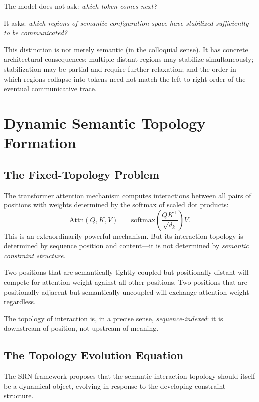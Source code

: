 \documentclass[11pt, a4paper]{article}
\theoremstyle{srn}
\theoremstyle{srnremark}
\begin{document}
The model does not ask: \emph{which token comes next?}

It asks: \emph{which regions of semantic configuration space have
stabilized sufficiently to be communicated?}

This distinction is not merely semantic (in the colloquial sense).
It has concrete architectural consequences: multiple distant regions
may stabilize simultaneously; stabilization may be partial and require
further relaxation; and the order in which regions collapse into tokens
need not match the left-to-right order of the eventual communicative
trace.

\section{Dynamic Semantic Topology Formation}
\label{sec:topology}

\subsection{The Fixed-Topology Problem}

The transformer attention mechanism computes interactions between
all pairs of positions with weights determined by the softmax of
scaled dot products:
\[
  \mathrm{Attn}(Q, K, V)
  \;=\;
  \mathrm{softmax}\!\left(\frac{QK^\top}{\sqrt{d_k}}\right) V.
\]
This is an extraordinarily powerful mechanism.
But its interaction topology is determined by sequence position and
content---it is not determined by \emph{semantic constraint structure}.

Two positions that are semantically tightly coupled but positionally
distant will compete for attention weight against all other positions.
Two positions that are positionally adjacent but semantically
uncoupled will exchange attention weight regardless.

The topology of interaction is, in a precise sense,
\emph{sequence-indexed}: it is downstream of position, not upstream of
meaning.

\subsection{The Topology Evolution Equation}

The SRN framework proposes that the semantic interaction topology
should itself be a dynamical object, evolving in response to the
developing constraint structure.
\end{document}

